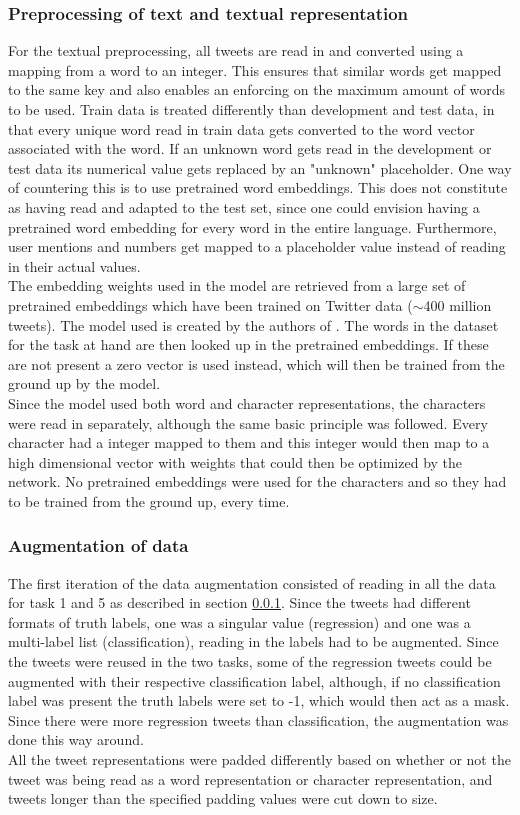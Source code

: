 \subsubsection{Preprocessing of text and textual representation} \label{sec:preprop}
For the textual preprocessing, all tweets are read in and converted using a mapping from a word to an integer. This ensures that similar words get mapped to the same key and also enables an enforcing on the maximum amount of words to be used. Train data is treated differently than development and test data, in that every unique word read in train data gets converted to the word vector associated with the word. If an unknown word gets read in the development or test data its numerical value gets replaced by an "unknown" placeholder. One way of countering this is to use pretrained word embeddings. This does not constitute as having read and adapted to the test set, since one could envision having a pretrained word embedding for every word in the entire language. Furthermore, user mentions and numbers get mapped to a placeholder value instead of reading in their actual values.\\
The embedding weights used in the model are retrieved from a large set of pretrained embeddings which have been trained on Twitter data ($\sim$400 million tweets). The model used is created by the authors of \cite{godin}. The words in the dataset for the task at hand are then looked up in the pretrained embeddings. If these are not present a zero vector is used instead, which will then be trained from the ground up by the model.\\
Since the model used both word and character representations, the characters were read in separately, although the same basic principle was followed. Every character had a integer mapped to them and this integer would then map to a high dimensional vector with weights that could then be optimized by the network. No pretrained embeddings were used for the characters and so they had to be trained from the ground up, every time.

\subsubsection{Augmentation of data} \label{sec:augm}
The first iteration of the data augmentation consisted of reading in all the data for task 1 and 5 as described in section \ref{sec:preprop}. Since the tweets had different formats of truth labels, one was a singular value (regression) and one was a multi-label list (classification), reading in the labels had to be augmented. Since the tweets were reused in the two tasks, some of the regression tweets could be augmented with their respective classification label, although, if no classification label was present the truth labels were set to -1, which would then act as a mask. Since there were more regression tweets than classification, the augmentation was done this way around.\\
All the tweet representations were padded differently based on whether or not the tweet was being read as a word representation or character representation, and tweets longer than the specified padding values were cut down to size. 

